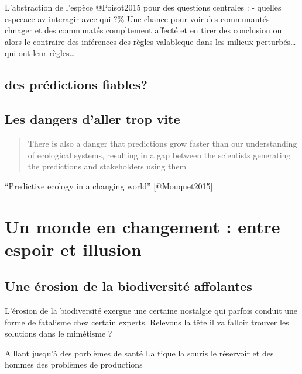 L'abstraction de l'espèce @Poisot2015 pour des questions centrales : -
quelles espceace av interagir avce qui ?\% Une chance pour voir des
communautés chnager et des communatés compltement affecté et en tirer
des conclusion ou alors le contraire des inférences des règles
valableque dans les milieux perturbés\ldots{} qui ont leur
règles\ldots{}

\subsection*{des prédictions fiables?}\label{des-pruxe9dictions-fiables}

\subsection*{Les dangers d'aller trop
vite}\label{les-dangers-daller-trop-vite}

\begin{quote}
There is also a danger that predictions grow faster than our
understanding of ecological systems, resulting in a gap between the
scientists generating the predictions and stakeholders using them
\end{quote}

``Predictive ecology in a changing world'' {[}@Mouquet2015{]}

\section*{Un monde en changement : entre espoir et
illusion}\label{un-monde-en-changement-entre-espoir-et-illusion}

\subsection*{Une érosion de la biodiversité
affolantes}\label{une-uxe9rosion-de-la-biodiversituxe9-affolantes}

L'érosion de la biodiversité exergue une certaine nostalgie qui parfois
conduit une forme de fatalisme chez certain experts. Relevons la tête il
va falloir trouver les solutions dans le mimétisme ?

Alllant jusqu'à des porblèmes de santé La tique la souris le réservoir
et des hommes des problèmes de productions

